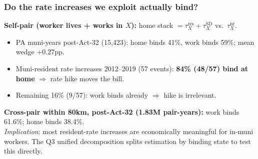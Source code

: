 \documentclass[xcolor = x11names, compress, aspectratio = 169]{beamer}
\renewcommand{\(}{\begin{columns}}
\renewcommand{\)}{\end{columns}}
\newcommand{\<}[1]{\begin{column}{#1}}
\renewcommand{\>}{\end{column}}
\begin{document}
\begin{frame}
\frametitle{Do the rate increases we exploit actually bind?}
    \footnotesize
    \textbf{Self-pair (worker lives + works in $X$):} home stack $= \tau^{\text{res}}_X + \tau^{\text{SD}}_X$ vs.\ $\tau^{\text{nr}}_X$.
    \begin{itemize}\setlength{\itemsep}{0.05cm}
        \item PA muni-years post-Act-32 (15{,}423): home binds 41\%, work binds 59\%; mean wedge $+0.27$pp.
        \item Muni-resident rate increases 2012--2019 (57 events):
        \textbf{84\% (48/57) bind at home} $\Rightarrow$ rate hike moves the bill.
        \item Remaining 16\% (9/57): work binds already $\Rightarrow$ hike is irrelevant.
    \end{itemize}
    \vspace{0.05cm}
    \textbf{Cross-pair within 80km, post-Act-32 (1.83M pair-years):}
    work binds 61.6\%; home binds 38.4\%.
    \vspace{0.05cm}\\
    \scriptsize \emph{Implication}: most resident-rate increases are economically meaningful for in-muni workers. The Q3 unified decomposition splits estimation by binding state to test this directly.
\end{frame}
\end{document}
